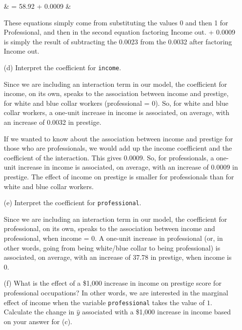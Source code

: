 \documentclass[12pt,letterpaper]{article}
\begin{document}
\begin{enumerate}
{		\begin{flalign*}
			&  = 58.92 + 0.0009 \cdot {} &
		\end{flalign*}
	} 
	
	These equations simply come from substituting the values 0 and then 1 for Professional, and then in the second equation factoring Income out. + 0.0009 is simply the result of subtracting the 0.0023 from the 0.0032 after factoring Income out. 
	
\newpage

	\item [(d)]
	Interpret the coefficient for \texttt{income}.
	\vspace{0.5cm}
	
	Since we are including an interaction term in our model, the coefficient for income, on its own, speaks to the association between income and prestige, for white and blue collar workers (professional = 0). So, for white and blue collar workers, a one-unit increase in income is associated, on average, with an increase of 0.0032 in prestige. 
	
	If we wanted to know about the association between income and prestige for those who are professionals, we would add up the income coefficient and the coefficient of the interaction. This gives 0.0009. So, for professionals, a one-unit increase in income is associated, on average, with an increase of 0.0009 in prestige. The effect of income on prestige is smaller for professionals than for white and blue collar workers. 
	
	\vspace{0.5cm}
	
	\item [(e)]
	Interpret the coefficient for \texttt{professional}.
	\vspace{0.5cm}
	
	Since we are including an interaction term in our model, the coefficient for professional, on its own, speaks to the association between income and professional, when income = 0. A one-unit increase in professional (or, in other words, going from being white/blue collar to being professional) is associated, on average, with an increase of 37.78 in prestige, when income is 0.
	
	\vspace{0.5cm}
	
	\item [(f)]
	What is the effect of a \$1,000 increase in income on prestige score for professional occupations? In other words, we are interested in the marginal effect of income when the variable \texttt{professional} takes the value of $1$. Calculate the change in $\hat{y}$ associated with a \$1,000 increase in income based on your answer for (c).
	\vspace{0.5cm}
	

\end{enumerate}
\end{document}
